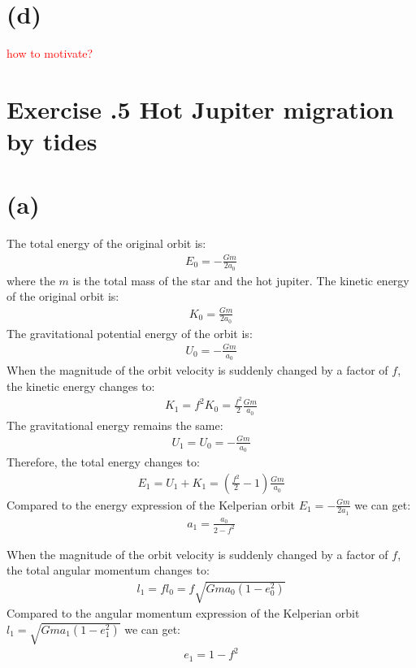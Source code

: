\documentclass[a4paper,12pt]{article}
\begin{document}
\section*{(d)}
\textcolor{red}{how to motivate?}

\section*{\textbf{Exercise \uppercase\expandafter{}.5 Hot Jupiter migration by tides}}
\section*{(a)}
The total energy of the original orbit is:
\begin{align*}
    E_0 = -\frac{Gm}{2a_0}
\end{align*}
where the $m$ is the total mass of the star and the hot jupiter.
The kinetic energy of the original orbit is:
\begin{align*}
    K_0 = \frac{Gm}{2a_0}
\end{align*}
The gravitational potential energy of the orbit is:
\begin{align*}
    U_0 = - \frac{Gm}{a_0}
\end{align*}
When the magnitude of the orbit velocity is suddenly changed by a factor of $f$, the kinetic energy changes to:
\begin{align*}
    K_1 = f^2 K_0 = \frac{f^2}{2} \frac{Gm}{a_0}
\end{align*}
The gravitational energy remains the same:
\begin{align*}
    U_1 = U_0 = - \frac{Gm}{a_0}
\end{align*}
Therefore, the total energy changes to:
\begin{align*}
    E_1 = U_1 + K_1 = (\frac{f^2}{2} - 1) \frac{Gm}{a_0}
\end{align*}
Compared to the energy expression of the Kelperian orbit $E_1 = - \frac{Gm}{2a_1}$ we can get:
\begin{align*}
    a_1 = \frac{a_0}{2 - f^2}
\end{align*}

When the magnitude of the orbit velocity is suddenly changed by a factor of $f$, the total angular momentum changes to:
\begin{align*}
    l_1 = fl_0 = f\sqrt{Gma_0(1-e_0^2)}
\end{align*}
Compared to the angular momentum expression of the Kelperian orbit $l_1 = \sqrt{Gma_1(1-e_1^2)}$ we can get:
\begin{align*}
    e_1 = 1 - f^2
\end{align*}
\end{document}
